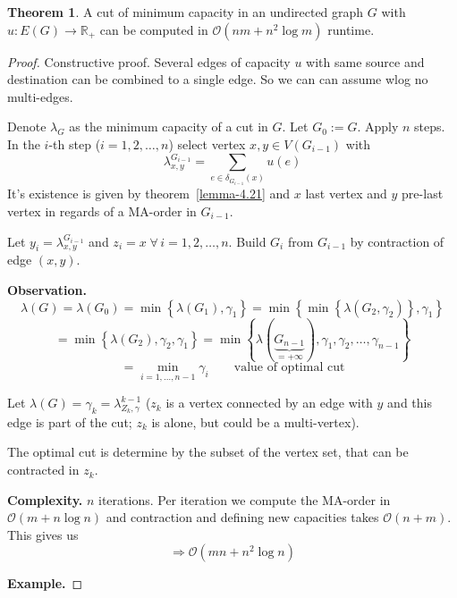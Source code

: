 \documentclass[a4paper]{article}
\theoremstyle{definition}
\newtheorem{theorem}{Theorem}
\newcommand{\set}[1]{\left\{#1\right\}}
\newcommand{\fall}{\;\forall\,}
\begin{document}
\begin{theorem}\label{satz-4.22}
  A cut of minimum capacity in an undirected graph $G$
  with $u: E(G) \rightarrow \mathbb{R}_+$ can be computed
  in $\mathcal{O}(nm + n^2 \log{m})$ runtime.
\end{theorem}

\begin{proof}
  Constructive proof.
  Several edges of capacity $u$ with same source and destination can be combined to a single edge.
  So we can can assume wlog no multi-edges.

  Denote $\lambda_G$ as the minimum capacity of a cut in $G$. Let $G_0 := G$. Apply $n$ steps.
  In the $i$-th step ($i = 1, 2, \ldots, n$) select vertex $x, y \in V(G_{i-1})$ with
  \[
    \lambda^{G_{i-1}}_{x,y} = \sum_{e \in \delta_{G_{i-1}}(x)} u(e)
  \]
  It's existence is given by theorem~\ref{lemma-4.21} and $x$ last vertex and $y$ pre-last vertex in regards of a MA-order in $G_{i-1}$.

  Let $y_i = \lambda^{G_{i-1}}_{x,y}$ and $z_i = x \fall i = 1, 2, \ldots, n$.
  Build $G_i$ from $G_{i-1}$ by contraction of edge $(x, y)$.

  \textbf{Observation.}
    \[
      \lambda(G) = \lambda(G_0) = \min{\set{\lambda(G_1), \gamma_1}}
        = \min{\set{\min{\set{\lambda(G_2, \gamma_2)}, \gamma_1}}}
    \] \[
        = \min{\set{\lambda(G_2), \gamma_2, \gamma_1}}
        = \min{\set{\lambda(\underbrace{G_{n-1}}_{=+\infty}), \gamma_1, \gamma_2, \ldots, \gamma_{n-1}}}
    \] \[
        = \min_{i=1,\ldots,n-1} \gamma_i \qquad \text{value of optimal cut}
    \]

    Let $\lambda(G) = \gamma_k = \lambda_{Z_k, \gamma}^{k-1}$ ($z_k$ is a vertex connected by an edge with $y$ and this edge is part of the cut; $z_k$ is alone, but could be a multi-vertex).

    The optimal cut is determine by the subset of the vertex set, that can be contracted in $z_k$.

  \textbf{Complexity.}
    $n$ iterations. Per iteration we compute the MA-order in $\mathcal{O}(m + n \log{n})$ and contraction and defining new capacities takes $\mathcal{O}(n+m)$. This gives us
    \[ \Rightarrow \mathcal{O}(mn + n^2 \log{n}) \]

  \textbf{Example.}


\end{proof}
\end{document}
